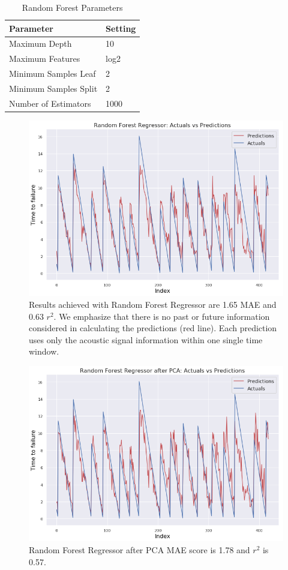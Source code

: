 \documentclass[]{llncs} %
\begin{document}
\begin{table}
	\begin{center}
		\caption{Random Forest Parameters}
		\label{tab:hyperparameters}
		\begin{tabular}{l|l} 
			\textbf{Parameter} & \textbf{Setting}\\
			\hline
			Maximum Depth & 10 \\ 
			Maximum Features & log2 \\ 
			Minimum Samples Leaf & 2 \\ 
			Minimum Samples Split & 2 \\ 
			Number of Estimators & 1000 \\
		\end{tabular}
	\end{center}
\end{table}

\par

\begin{figure}
	\centering
	\includegraphics[width=.9\linewidth]{results1}
	\caption{Results achieved with Random Forest Regressor are 1.65 MAE and 0.63 $r^2$. We emphasize that there is no past or future information considered in calculating the predictions (red line). Each prediction uses only the acoustic signal information within one single time window.}
	\label{fig:results1}
\end{figure}


\begin{figure}
	\centering
	\includegraphics[width=.9\linewidth]{results1PCA}
	\caption{Random Forest Regressor after PCA MAE score is 1.78 and $r^2$ is 0.57.}
	\label{fig:results1PCA}
\end{figure}
\end{document}
